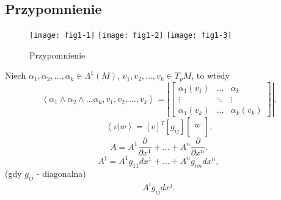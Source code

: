 \documentclass[../main.tex]{subfiles}
\begin{document}
    \subsection{Przypomnienie}
    \begin{figure}[h]
        \texttt{[image: fig1-1]}
        \texttt{[image: fig1-2]}
        \texttt{[image: fig1-3]}
        \caption{Przypomnienie}
        \label{fig:fig1-1}
    \end{figure}
    Niech $\alpha_1, \alpha_2, \ldots, \alpha_k \in \Lambda^1(M)$, $v_1, v_2, \ldots, v_k \in T_pM$, to wtedy
    \[
        \left<\alpha_1\land \alpha_2\land \ldots\alpha_k, v_1, v_2, \ldots, v_k \right> = \left| \begin{bmatrix} \alpha_1(v_1) & \ldots & \alpha_k\\ \vdots & \ddots & \vdots\\ \alpha_1(v_k) & \ldots & \alpha_k(v_k) \end{bmatrix} \right|
    .\]
    \[
        \left< v | w \right> = [v]^T [g_{ij}] \begin{bmatrix} \\w \\ \\ \end{bmatrix}
    .\]
\[
    A = A^1 \frac{\partial }{\partial x^1} + \ldots + A^n \frac{\partial }{\partial x^n}
.\]
\[
A^\sharp = A^1g_{11}dx^1 + \ldots + A^ng_{nn}dx^n
,\]
(gdy $g_{ij}$ - diagonalna)
\[
    A^ig_{ij}dx^j
.\]
\end{document}
